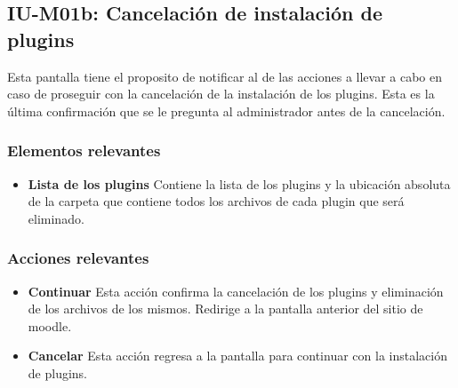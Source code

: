 
\subsection{IU-M01b: Cancelación de instalación de plugins}

 Esta pantalla tiene el proposito de notificar al  de las acciones a
 llevar a cabo en caso de proseguir con la cancelación de la instalación de los plugins. Esta es
 la última confirmación que se le pregunta al administrador antes de la cancelación.


\subsubsection{Elementos relevantes}

    \begin{itemize}
    \item {\bf Lista de los plugins}
        Contiene la lista de los plugins y la ubicación absoluta de la carpeta
        que contiene todos los archivos de cada plugin que será eliminado.
    \end{itemize}

\subsubsection{Acciones relevantes}

    \begin{itemize}
    \item {\bf Continuar}
        Esta acción confirma la cancelación de los plugins y eliminación de los
        archivos de los mismos. Redirige a la pantalla anterior del sitio de moodle.

    \item {\bf Cancelar}
        Esta acción regresa a la pantalla  para continuar con la instalación
        de plugins.
    \end{itemize}

